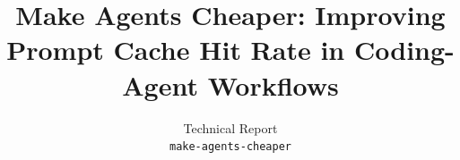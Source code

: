 \documentclass{article}
\title{Make Agents Cheaper: Improving Prompt Cache Hit Rate in Coding-Agent Workflows}
\author{
Technical Report \\
\texttt{make-agents-cheaper}
}
\begin{document}
\maketitle

\begin{abstract}

\end{abstract}








\clearpage
\nocite{makeagentscheaper2026}



\clearpage
\appendix

\end{document}
